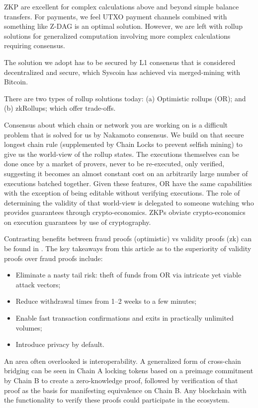 \documentclass[peerreview]{ieeesyscoin}
\begin{document}
ZKP are excellent for complex calculations above and beyond simple balance transfers. For payments, we feel UTXO payment channels combined with something like Z-DAG is an optimal solution. However, we are left with rollup solutions for generalized computation involving more complex calculations requiring consensus.

The solution we adopt has to be secured by L1 consensus that is considered decentralized and secure, which Syscoin has achieved via merged-mining with Bitcoin.

There are two types of rollup solutions today: (a) Optimistic rollups (OR); and (b) zkRollups; which offer trade-offs.

Consensus about which chain or network you are working on is a difficult problem that is solved for us by Nakamoto consensus. We build on that secure longest chain rule (supplemented by Chain Locks to prevent selfish mining) to give us the world-view of the rollup states. The executions themselves can be done once by a market of provers, never to be re-executed, only verified, suggesting it becomes an almost constant cost on an arbitrarily large number of executions batched together. Given these features, OR have the same capabilities with the exception of being editable without verifying executions. The role of determining the validity of that world-view is delegated to someone watching who provides guarantees through crypto-economics. ZKPs obviate crypto-economics on execution guarantees by use of cryptography.

Contrasting benefits between fraud proofs (optimistic) vs validity proofs (zk) can be found in \cite{Sta19}. The key takeaways from this article as to the superiority of validity proofs over fraud proofs include:

\begin{itemize}
\item Eliminate a nasty tail risk: theft of funds from OR via intricate yet viable attack vectors;
\item Reduce withdrawal times from 1–2 weeks to a few minutes;
\item Enable fast transaction confirmations and exits in practically unlimited volumes;
\item Introduce privacy by default.
\end{itemize}

An area often overlooked is interoperability. A generalized form of cross-chain bridging can be seen in Chain A locking tokens based on a preimage commitment by Chain B to create a zero-knowledge proof, followed by verification of that proof as the basis for manifesting equivalence on Chain B. Any blockchain with the functionality to verify these proofs could participate in the ecosystem.
\end{document}
